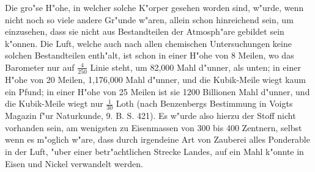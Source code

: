 \documentclass[a4paper, 11pt, oneside, polutonikogreek, german]{article}
\begin{document}
Die gro"se H"ohe, in welcher solche K"orper gesehen worden sind, w"urde, wenn nicht noch so viele andere Gr"unde w"aren, allein schon hinreichend sein, um einzusehen, dass sie nicht aus Bestandteilen der Atmosph"are gebildet sein k"onnen. Die Luft, welche auch nach allen chemischen Untersuchungen keine solchen Bestandteilen enth"alt, ist schon in einer H"ohe von 8 Meilen, wo das Barometer nur auf $\mathfrak{\frac{4}{250}}$ Linie steht, um 82,000 Mahl d"unner, als unten; in einer H"ohe von 20 Meilen, 1,176,000 Mahl d"unner, und die Kubik-Meile wiegt kaum ein Pfund; in einer H"ohe von 25 Meilen ist sie 1200 Billionen Mahl d"unner, und die Kubik-Meile wiegt nur $\mathfrak{\frac{1}{30}}$ Loth (nach Benzenbergs Bestimmung in Voigts Magazin f"ur Naturkunde, 9. B. S. 421). Es w"urde also hierzu der Stoff nicht vorhanden sein, am wenigsten zu Eisenmassen von 300 bis 400 Zentnern, selbst wenn es m"oglich w"are, dass durch irgendeine Art von Zauberei alles Ponderable in der Luft, "uber einer betr"achtlichen Strecke Landes, auf ein Mahl k"onnte in Eisen und Nickel verwandelt werden.
\subsection{}
\end{document}
